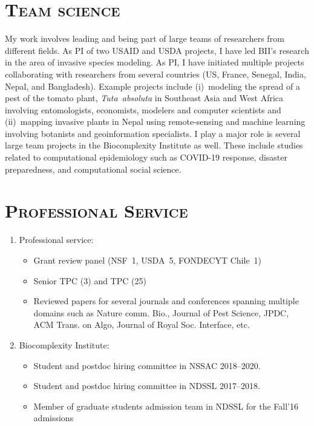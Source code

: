 \documentclass[margin,10pt]{res}
\newcommand{\tutafull}{\emph{Tuta~absoluta}}
\begin{document}
\begin{resume}
\section{\textnormal{\textsc{Team science}}}
My work involves leading and being part of large teams of researchers from
different fields.  As PI of two USAID and USDA projects, I have led BII’s
research in the area of invasive species modeling. As PI, I have initiated
multiple projects collaborating with researchers from several countries
(US, France, Senegal, India, Nepal, and Bangladesh). Example projects
include (i)~modeling the spread of a pest of the tomato plant, \tutafull{} in
Southeast Asia and West Africa involving entomologists, economists,
modelers and computer scientists and (ii)~mapping invasive plants in Nepal
using remote-sensing and machine learning involving botanists and
geoinformation specialists. I play a major role is several large team projects in the
Biocomplexity Institute as well. These include studies related to
computational epidemiology such as COVID-19 response, disaster
preparedness, and computational social science.

\section{\textnormal{\textsc{Professional Service}}}
\begin{enumerate}[$\circ$]
    \item Professional service: 
    \begin{itemize}
        \item Grant review panel (NSF~1, USDA~5, FONDECYT Chile~1)
        \item Senior TPC (3) and TPC (25)
        \item Reviewed papers for several journals and conferences
        spanning multiple domains such as Nature comm. Bio., Journal of
        Pest Science, JPDC, ACM Trans. on Algo, Journal of Royal Soc.
        Interface, etc.
    \end{itemize}
    \item Biocomplexity Institute:
    \begin{itemize}
        \item Student and postdoc hiring committee in NSSAC 2018--2020.
        \item Student and postdoc hiring committee in NDSSL 2017--2018.
\item Member of graduate students admission team in NDSSL for the Fall'16
admissions
    \end{itemize}
\end{enumerate}



\end{resume}
\end{document}
